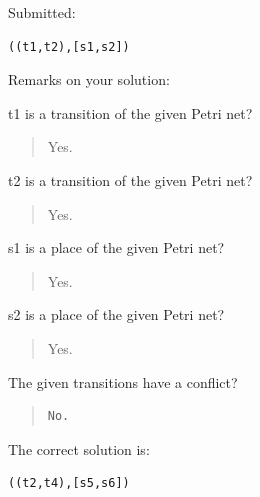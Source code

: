 Submitted:


\begin{verbatim}
((t1,t2),[s1,s2])
\end{verbatim}


Remarks on your solution:

t1 is a transition of the given Petri net?\begin{quote}Yes.\end{quote}t2 is a transition of the given Petri net?\begin{quote}Yes.\end{quote}s1 is a place of the given Petri net?\begin{quote}Yes.\end{quote}s2 is a place of the given Petri net?\begin{quote}Yes.\end{quote}The given transitions have a conflict?

\begin{quote}
\begin{verbatim}
No.
\end{verbatim}
\end{quote}

The correct solution is:
\begin{verbatim}
((t2,t4),[s5,s6])
\end{verbatim}


